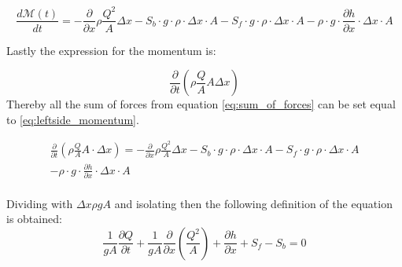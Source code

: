 \begin{equation}
\frac{d \mathcal{M}(t)}{dt}	=- \frac{\partial}{\partial x} \rho \frac{Q^2}{A}\Delta x
-S_b \cdot g \cdot \rho \cdot \Delta x \cdot A -S_f \cdot g \cdot \rho \cdot \Delta x \cdot A  -\rho\cdot g \cdot \frac{\partial h}{\partial x} \cdot \Delta x \cdot A
\label{eq:sum_of_forces}
\end{equation}

Lastly the expression for the momentum is:

\begin{equation}\label{eq:leftside_momentum}
	\frac{\partial}{\partial t} \left(\rho \frac{Q}{A}A\Delta x\right)
\end{equation}
Thereby all the sum of forces from equation \ref{eq:sum_of_forces} can be set equal to  \ref{eq:leftside_momentum}.%

\begin{equation}
\begin{array}{l}
\frac{\partial}{\partial t} (\rho \frac{Q}{A}A\cdot \Delta x) = - \frac{\partial}{\partial x} \rho \frac{Q^2}{A}\Delta x -S_b \cdot g \cdot \rho \cdot \Delta x \cdot A -S_f \cdot g \cdot \rho \cdot \Delta x \cdot A \\ 
-\rho\cdot g \cdot \frac{\partial h}{\partial x} \cdot \Delta x \cdot A 

\end{array}
\end{equation}
\\
Dividing with $\Delta x \rho g A$ and isolating then the following definition of the equation is obtained:
\\
\begin{equation}
\boxed{\frac{1}{gA} \frac{\partial Q}{\partial t} +\frac{1}{gA}\frac{\partial}{\partial x} \left( \frac{Q^2}{A} \right) + \frac{\partial h}{\partial x} + S_f - S_b = 0}
\label{saintbernard_momentum}
\end{equation}
\\

